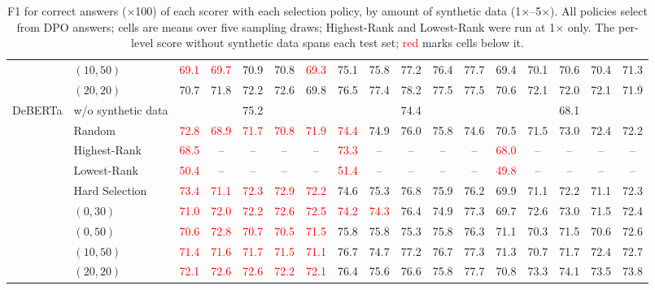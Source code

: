 \begin{table}[t]
\begin{tabular}{llccccccccccccccc}
 & $(10, 50)$ & \textcolor{red}{69.1} & \textcolor{red}{69.7} & 70.9 & 70.8 & \textcolor{red}{69.3} & 75.1 & 75.8 & 77.2 & 76.4 & 77.7 & 69.4 & 70.1 & 70.6 & 70.4 & 71.3 \\
 & $(20, 20)$ & 70.7 & 71.8 & 72.2 & 72.6 & 69.8 & 76.5 & 77.4 & 78.2 & 77.5 & 77.5 & 70.6 & 72.1 & 72.0 & 72.1 & 71.9 \\
\midrule
\multirow{9}{*}{DeBERTa} & w/o synthetic data & \multicolumn{5}{c}{75.2} & \multicolumn{5}{c}{74.4} & \multicolumn{5}{c}{68.1} \\
 & Random & \textcolor{red}{72.8} & \textcolor{red}{68.9} & \textcolor{red}{71.7} & \textcolor{red}{70.8} & \textcolor{red}{71.9} & \textcolor{red}{74.4} & 74.9 & 76.0 & 75.8 & 74.6 & 70.5 & 71.5 & 73.0 & 72.4 & 72.2 \\
 & Highest-Rank & \textcolor{red}{68.5} & -- & -- & -- & -- & \textcolor{red}{73.3} & -- & -- & -- & -- & \textcolor{red}{68.0} & -- & -- & -- & -- \\
 & Lowest-Rank & \textcolor{red}{50.4} & -- & -- & -- & -- & \textcolor{red}{51.4} & -- & -- & -- & -- & \textcolor{red}{49.8} & -- & -- & -- & -- \\
 & Hard Selection & \textcolor{red}{73.4} & \textcolor{red}{71.1} & \textcolor{red}{72.3} & \textcolor{red}{72.9} & \textcolor{red}{72.2} & 74.6 & 75.3 & 76.8 & 75.9 & 76.2 & 69.9 & 71.1 & 72.2 & 71.1 & 72.3 \\
 & $(0, 30)$ & \textcolor{red}{71.0} & \textcolor{red}{72.0} & \textcolor{red}{72.2} & \textcolor{red}{72.6} & \textcolor{red}{72.5} & \textcolor{red}{74.2} & \textcolor{red}{74.3} & 76.4 & 74.9 & 77.3 & 69.7 & 72.6 & 73.0 & 71.5 & 72.4 \\
 & $(0, 50)$ & \textcolor{red}{70.6} & \textcolor{red}{72.8} & \textcolor{red}{70.7} & \textcolor{red}{70.5} & \textcolor{red}{71.5} & 75.8 & 75.8 & 75.3 & 75.8 & 76.3 & 71.1 & 70.3 & 71.5 & 70.6 & 72.6 \\
 & $(10, 50)$ & \textcolor{red}{71.4} & \textcolor{red}{71.6} & \textcolor{red}{71.7} & \textcolor{red}{71.5} & \textcolor{red}{71.1} & 76.7 & 74.7 & 77.2 & 76.7 & 77.3 & 71.3 & 70.7 & 71.7 & 72.4 & 72.7 \\
 & $(20, 20)$ & \textcolor{red}{72.1} & \textcolor{red}{72.6} & \textcolor{red}{72.6} & \textcolor{red}{72.2} & \textcolor{red}{72.1} & 76.4 & 75.6 & 76.6 & 75.8 & 77.7 & 70.8 & 73.3 & 74.1 & 73.5 & 73.8 \\
\bottomrule
\end{tabular}
\caption{F1 for correct answers ($\times$100) of each scorer with each selection policy, by amount of synthetic data (1$\times$--5$\times$). All policies select from DPO answers; cells are means over five sampling draws; Highest-Rank and Lowest-Rank were run at 1$\times$ only. The per-level score without synthetic data spans each test set; \textcolor{red}{red} marks cells below it.}
\label{tab:appendix-selection-amount-level-2}
\end{table}
